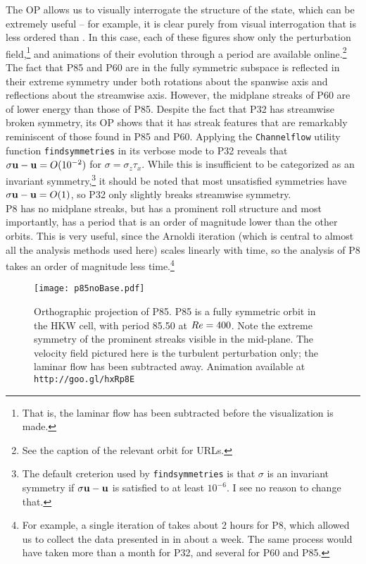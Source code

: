 The OP allows us to visually interrogate the structure of the state, which can be extremely useful -- for example, it is clear purely from visual interrogation that  is less ordered than . In this case, each of these figures show only the perturbation field,\footnote{That is, the laminar flow has been subtracted before the visualization is made.} and animations of their evolution through a period are available online.\footnote{See the caption of the relevant orbit for URLs.} The fact that P85 and P60 are in the fully symmetric subspace is reflected in their extreme symmetry under both rotations about the spanwise axis and reflections about the streamwise axis. However, the midplane streaks of P60 are of lower energy than those of P85. Despite the fact that P32 has streamwise broken symmetry, its OP shows that it has streak features that are remarkably reminiscent of those found in P85 and P60. Applying the {\tt Channelflow} utility function {\tt findsymmetries} in its verbose mode to P32 reveals that $\sigma \mathbf{u} - \mathbf{u} = O(10^{-2})$ for $\sigma = \sigma_z \tau_x$. While this is insufficient to be categorized as an invariant symmetry,\footnote{The default creterion used by {\tt findsymmetries} is that $\sigma$ is an invariant symmetry if $\sigma\mathbf{u} - \mathbf{u}$ is satisfied to at least $10^{-6}$. I see no reason to change that.} it should be noted that most unsatisfied symmetries have  $\sigma\mathbf{u} - \mathbf{u} = O(1)$, so P32 only slightly breaks streamwise symmetry.\\

P8 has no midplane streaks, but has a prominent roll structure and most importantly, has a period that is an order of magnitude lower than the other orbits. This is very useful, since the Arnoldi iteration (which is central to almost all the analysis methods used here) scales linearly with time, so the analysis of P8 takes an order of magnitude less time.\footnote{For example, a single iteration of  takes about 2 hours for P8, which allowed us to collect the data presented in  in about a week. The same process would have taken more than a month for P32, and several for P60 and P85.}

\begin{figure}[h!]
\centerline{\texttt{[image: p85noBase.pdf]}}
\caption[Orthographic projection of P85.]{Orthographic projection of P85. P85 is a fully symmetric orbit in the HKW cell, with period 85.50 at $Re=400$. Note the extreme symmetry of the prominent streaks visible in the mid-plane. The velocity field pictured here is the turbulent perturbation only; the laminar flow has been subtracted away.{ Animation available at {\tt http://goo.gl/hxRp8E}}}\label{fig:p85}
\end{figure}

